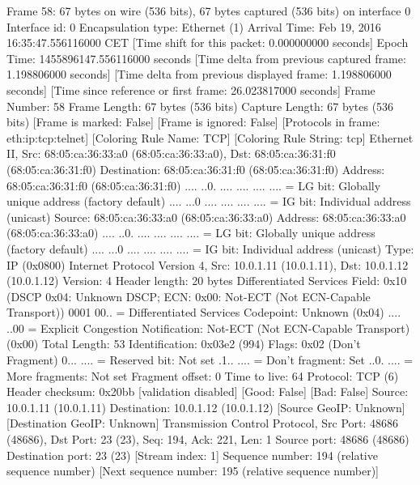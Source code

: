 Frame 58: 67 bytes on wire (536 bits), 67 bytes captured (536 bits) on interface 0
    Interface id: 0
    Encapsulation type: Ethernet (1)
    Arrival Time: Feb 19, 2016 16:35:47.556116000 CET
    [Time shift for this packet: 0.000000000 seconds]
    Epoch Time: 1455896147.556116000 seconds
    [Time delta from previous captured frame: 1.198806000 seconds]
    [Time delta from previous displayed frame: 1.198806000 seconds]
    [Time since reference or first frame: 26.023817000 seconds]
    Frame Number: 58
    Frame Length: 67 bytes (536 bits)
    Capture Length: 67 bytes (536 bits)
    [Frame is marked: False]
    [Frame is ignored: False]
    [Protocols in frame: eth:ip:tcp:telnet]
    [Coloring Rule Name: TCP]
    [Coloring Rule String: tcp]
Ethernet II, Src: 68:05:ca:36:33:a0 (68:05:ca:36:33:a0), Dst: 68:05:ca:36:31:f0 (68:05:ca:36:31:f0)
    Destination: 68:05:ca:36:31:f0 (68:05:ca:36:31:f0)
        Address: 68:05:ca:36:31:f0 (68:05:ca:36:31:f0)
        .... ..0. .... .... .... .... = LG bit: Globally unique address (factory default)
        .... ...0 .... .... .... .... = IG bit: Individual address (unicast)
    Source: 68:05:ca:36:33:a0 (68:05:ca:36:33:a0)
        Address: 68:05:ca:36:33:a0 (68:05:ca:36:33:a0)
        .... ..0. .... .... .... .... = LG bit: Globally unique address (factory default)
        .... ...0 .... .... .... .... = IG bit: Individual address (unicast)
    Type: IP (0x0800)
Internet Protocol Version 4, Src: 10.0.1.11 (10.0.1.11), Dst: 10.0.1.12 (10.0.1.12)
    Version: 4
    Header length: 20 bytes
    Differentiated Services Field: 0x10 (DSCP 0x04: Unknown DSCP; ECN: 0x00: Not-ECT (Not ECN-Capable Transport))
        0001 00.. = Differentiated Services Codepoint: Unknown (0x04)
        .... ..00 = Explicit Congestion Notification: Not-ECT (Not ECN-Capable Transport) (0x00)
    Total Length: 53
    Identification: 0x03e2 (994)
    Flags: 0x02 (Don't Fragment)
        0... .... = Reserved bit: Not set
        .1.. .... = Don't fragment: Set
        ..0. .... = More fragments: Not set
    Fragment offset: 0
    Time to live: 64
    Protocol: TCP (6)
    Header checksum: 0x20bb [validation disabled]
        [Good: False]
        [Bad: False]
    Source: 10.0.1.11 (10.0.1.11)
    Destination: 10.0.1.12 (10.0.1.12)
    [Source GeoIP: Unknown]
    [Destination GeoIP: Unknown]
Transmission Control Protocol, Src Port: 48686 (48686), Dst Port: 23 (23), Seq: 194, Ack: 221, Len: 1
    Source port: 48686 (48686)
    Destination port: 23 (23)
    [Stream index: 1]
    Sequence number: 194    (relative sequence number)
    [Next sequence number: 195    (relative sequence number)]
